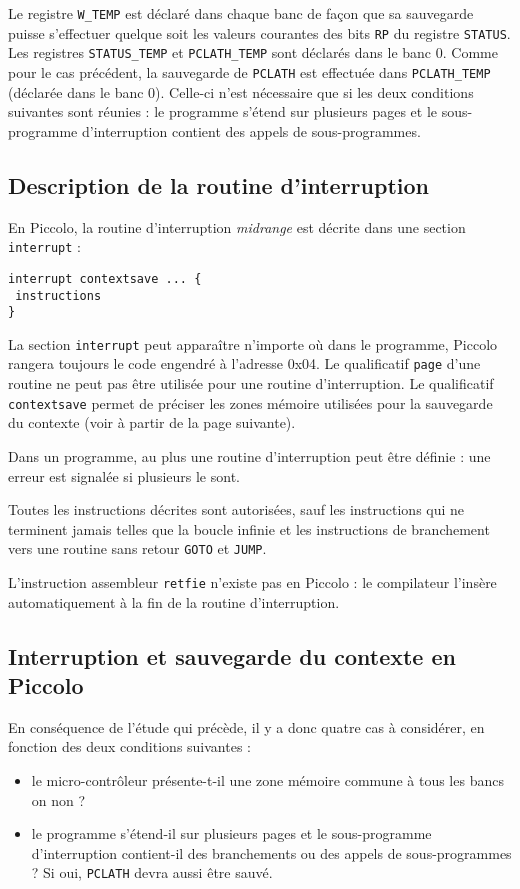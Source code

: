 Le registre \texttt{W\_TEMP} est déclaré dans chaque banc de façon que sa sauvegarde puisse s’effectuer quelque soit les valeurs courantes des bits \texttt{RP} du registre \texttt{STATUS}. Les registres \texttt{STATUS\_TEMP} et \texttt{PCLATH\_TEMP} sont déclarés dans le banc 0. Comme pour le cas précédent, la sauvegarde de \texttt{PCLATH} est effectuée dans \texttt{PCLATH\_TEMP} (déclarée dans le banc 0). Celle-ci n'est nécessaire que si les deux conditions suivantes sont réunies : le programme s’étend sur plusieurs pages et le sous-programme d’interruption contient des appels de sous-programmes.

\subsection{Description de la routine d'interruption}


En Piccolo, la routine d’interruption \emph{midrange} est décrite dans une section \texttt{interrupt} :

\begin{lstlisting}[language=piccolo]
interrupt contextsave ... {
 instructions
}
\end{lstlisting}

La section \texttt{interrupt} peut apparaître n’importe où dans le programme, Piccolo rangera toujours le code engendré à l’adresse 0x04. Le qualificatif \texttt{page} d’une routine ne peut pas être utilisée pour une routine d’interruption. Le qualificatif \texttt{contextsave} permet de préciser les zones mémoire utilisées pour la sauvegarde du contexte (voir à partir de la page suivante).

Dans un programme, au plus une routine d’interruption peut être définie : une erreur est signalée si plusieurs le sont.

Toutes les instructions décrites sont autorisées, sauf les instructions qui ne terminent jamais telles que la boucle infinie et les instructions de branchement vers une routine sans retour \texttt{GOTO} et \texttt{JUMP}.

L’instruction assembleur \texttt{retfie} n’existe pas en Piccolo : le compilateur l’insère automatiquement à la fin de la routine d’interruption.

\subsection{Interruption et sauvegarde du contexte en Piccolo}

En conséquence de l'étude qui précède, il y a donc quatre cas à considérer, en fonction des deux conditions suivantes :
\begin{itemize}
  \item le micro-contrôleur présente-t-il une zone mémoire commune à tous les bancs on non ?
  \item le programme s’étend-il sur plusieurs pages et le sous-programme d’interruption contient-il des branchements ou des appels de sous-programmes ? Si oui, \texttt{PCLATH} devra aussi être sauvé.
\end{itemize}


